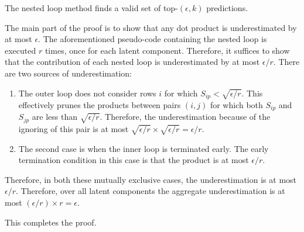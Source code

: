 \begin{prop}
The nested loop method finds a valid set of top-$(\epsilon, k)$
predictions.
\end{prop}
\begin{IEEEproof}
The main part of the proof is to show that any dot product is
underestimated by at most  $\epsilon$. The aforementioned pseudo-code
containing the  nested loop is executed $r$ times, once for each
latent component. Therefore, it suffices to show that the
contribution of each nested loop is underestimated by at most
$\epsilon/r$. There are two sources of underestimation:
\begin{enumerate}
\item  The outer loop does not consider rows $i$ for which $S_{ip} <
\sqrt{\epsilon/r}$. This effectively prunes the products between
pairs $(i, j)$ for which both $S_{ip}$ and $S_{jp}$ are less
than $\sqrt{\epsilon/r}$. Therefore, the underestimation because of
the ignoring of this pair is at most $\sqrt{\epsilon/r} \times
\sqrt{\epsilon/r} = \epsilon/r$.
\item The second case is when the inner loop is terminated early.
The early termination condition in this case is that the product is
at most $\epsilon/r$.
\end{enumerate}
Therefore, in both these mutually exclusive cases, the
underestimation is at most $\epsilon/r$. Therefore, over all latent
components the aggregate underestimation is at most
$(\epsilon/r)\times r= \epsilon$.

This completes the proof.
\end{IEEEproof}

